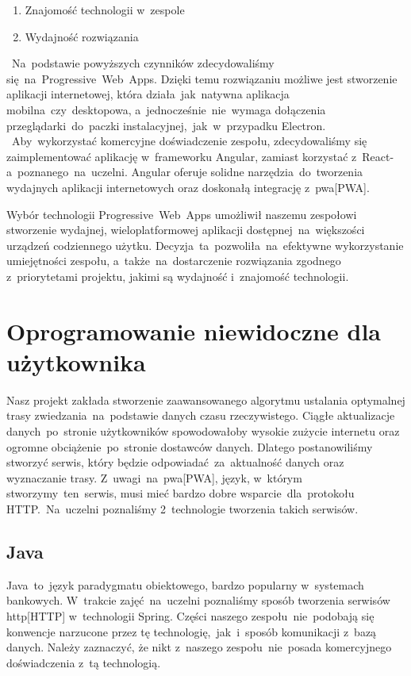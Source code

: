 \begin{enumerate}
    \item Znajomość technologii w~zespole
    \item Wydajność rozwiązania
\end{enumerate}
~Na~podstawie powyższych czynników zdecydowaliśmy się~na~Progressive~Web~Apps.
Dzięki temu rozwiązaniu możliwe jest stworzenie aplikacji internetowej, która działa~jak~natywna aplikacja mobilna~czy~desktopowa, a~jednocześnie~nie~wymaga dołączenia przeglądarki~do~paczki instalacyjnej,~jak~w~przypadku Electron.
~Aby~wykorzystać komercyjne doświadczenie zespołu, zdecydowaliśmy się zaimplementować aplikację w~frameworku Angular, zamiast korzystać z~React-a~poznanego~na~uczelni.
Angular oferuje solidne narzędzia~do~tworzenia wydajnych aplikacji internetowych oraz doskonałą integrację z~\acrshort{pwa}[PWA]. 

Wybór technologii Progressive~Web~Apps umożliwił naszemu zespołowi stworzenie wydajnej, wieloplatformowej aplikacji dostępnej~na~większości urządzeń codziennego użytku.
Decyzja~ta~pozwoliła~na~efektywne wykorzystanie umiejętności zespołu, a~także~na~dostarczenie rozwiązania zgodnego z~priorytetami projektu, jakimi są wydajność i~znajomość technologii.

\section{Oprogramowanie niewidoczne dla użytkownika}
\label{sec:oprogramowanie-niewidoczne-dla-uzytkownika}
Nasz projekt zakłada stworzenie zaawansowanego algorytmu ustalania optymalnej trasy zwiedzania~na~podstawie danych czasu rzeczywistego.
Ciągłe aktualizacje danych~po~stronie użytkowników spowodowałoby wysokie zużycie internetu oraz ogromne obciążenie~po~stronie dostawców danych.
Dlatego postanowiliśmy stworzyć serwis, który będzie odpowiadać~za~aktualność danych oraz wyznaczanie trasy.
Z~uwagi~na~\acrshort{pwa}[PWA], język, w~którym stworzymy~ten~serwis, musi mieć bardzo dobre wsparcie~dla~protokołu HTTP\@.~Na~uczelni poznaliśmy 2~technologie tworzenia takich serwisów.

\subsection{Java}\label{subsec:java}
Java~to~język paradygmatu obiektowego, bardzo popularny w~systemach bankowych.
W~trakcie zajęć~na~uczelni poznaliśmy sposób tworzenia serwisów \acrshort{http}[HTTP] w~technologii Spring.
Części naszego zespołu~nie~podobają się konwencje narzucone przez tę technologię,~jak~i~sposób komunikacji z~bazą danych.
Należy zaznaczyć, że nikt z~naszego zespołu~nie~posada komercyjnego doświadczenia z~tą technologią.

